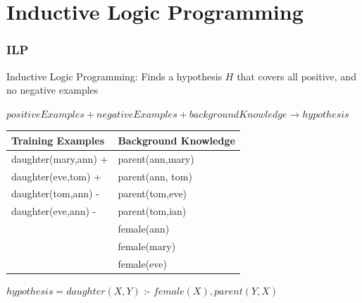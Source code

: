 \documentclass{beamer}
\begin{document}
\section{Inductive Logic Programming}
\begin{frame}
\frametitle{ILP}
 Inductive Logic Programming: Finds a hypothesis $H$ that covers all positive, and no negative examples
  \begin{fontsize}{10}{10}
    \begin{center}
    $positiveExamples + negativeExamples + background Knowledge \rightarrow hypothesis$
    \end{center}

    \begin{table}
      \begin{tabular}{ l  l }
      \toprule
      \textbf{Training Examples} & \textbf{Background Knowledge}\\
      \midrule
      daughter(mary,ann) +	& parent(ann,mary)	\\
      daughter(eve,tom) +	& parent(ann, tom)	\\
      daughter(tom,ann) - 	& parent(tom,eve)	\\
      daughter(eve,ann) -	& parent(tom,ian) 	\\
				& female(ann)		\\
				& female(mary)		\\
				& female(eve)		\\
      \bottomrule
      \end{tabular}
    \end{table}

    \begin{center}
      $hypothesis = daughter(X,Y)$ :- $female(X),parent(Y,X)$ 
    \end{center}
  \end{fontsize}
\end{frame}
\end{document}
